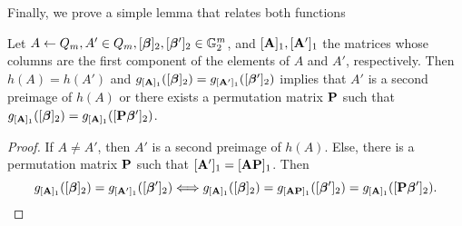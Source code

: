 Finally, we prove a simple lemma that relates both functions
\begin{lemma}\label{lemma:hg}
Let $A\gets Q_m,A'\in Q_m,[{\boldsymbol{\beta}}]_2,[{\boldsymbol{\beta}}']_2\in\mathbb{G}^m_2$, and $[\mathbf{{A}}]_1,[\mathbf{{A}}']_1$ the matrices whose columns are the first component of the elements of $A$ and $A'$, respectively. Then $h(A)=h(A')$ and $g_{[\mathbf{{A}}]_1}([{\boldsymbol{\beta}}]_2)=g_{[\mathbf{{A}}']_1}([{\boldsymbol{\beta}}']_2)$ implies that $A'$ is a second preimage of $h(A)$ or there exists a permutation matrix $\mathbf{{P}}$ such that $g_{[\mathbf{{A}}]_1}([{\boldsymbol{\beta}}]_2)=g_{[\mathbf{{A}}]_1}([\mathbf{{P}}{\boldsymbol{\beta}}']_2)$.
\end{lemma}
\begin{proof}
If $A\neq A'$, then $A'$ is a second preimage of $h(A)$. Else, there is a permutation matrix $\mathbf{{P}}$ such that $[\mathbf{{A}}']_1 =[\mathbf{{A}}\mathbf{{P}}]_1$. Then
$$
 g_{[\mathbf{{A}}]_1}([{\boldsymbol{\beta}}]_2)=g_{[\mathbf{{A}}']_1}([{\boldsymbol{\beta}}']_2)\Longleftrightarrow  g_{[\mathbf{{A}}]_1}([{\boldsymbol{\beta}}]_2)=g_{[\mathbf{{A}}\mathbf{{P}}]_1}([{\boldsymbol{\beta}}']_2)=g_{[\mathbf{{A}}]_1}([\mathbf{{P}}{\boldsymbol{\beta}}']_2).
$$
\end{proof}